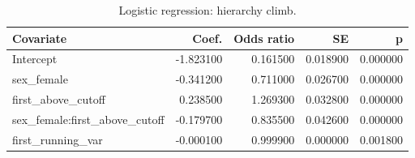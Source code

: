 \begin{table}[htbp]
\centering
\begin{tabular}{lrrrr}
\toprule
Covariate & Coef. & Odds ratio & SE & p \\
\midrule
Intercept & -1.823100 & 0.161500 & 0.018900 & 0.000000 \\
sex_female & -0.341200 & 0.711000 & 0.026700 & 0.000000 \\
first_above_cutoff & 0.238500 & 1.269300 & 0.032800 & 0.000000 \\
sex_female:first_above_cutoff & -0.179700 & 0.835500 & 0.042600 & 0.000000 \\
first_running_var & -0.000100 & 0.999900 & 0.000000 & 0.001800 \\
\bottomrule
\end{tabular}

\caption{Logistic regression: hierarchy climb.}
\label{tab:climb}
\end{table}
